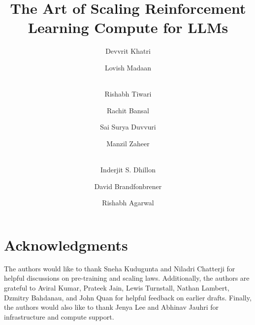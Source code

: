\documentclass[]{fairmeta} %
\title{The Art of Scaling Reinforcement Learning Compute for LLMs}
\author[2,*,\dagger]{Devvrit Khatri}
\author[1,3,*]{Lovish Madaan}
\author[4 \dagger]{\\Rishabh Tiwari}
\author[5 \dagger]{Rachit Bansal}
\author[2 \dagger]{Sai Surya Duvvuri}
\author[1 \dagger]{Manzil Zaheer}
\author[2]{\\Inderjit S. Dhillon}
\author[1]{David Brandfonbrener}
\author[6, \dagger]{Rishabh Agarwal}
\affiliation[1]{Meta}
\affiliation[2]{UT Austin}
\affiliation[3]{UCL}
\affiliation[4]{UC Berkeley}
\affiliation[5]{Harvard University}
\affiliation[6]{Periodic Labs}
\begin{document}
\maketitle









\section{Acknowledgments}
The authors would like to thank Sneha Kudugunta and Niladri Chatterji for helpful discussions on pre-training and scaling laws. Additionally, the authors are grateful to Aviral Kumar, Prateek Jain, Lewis Turnstall, Nathan Lambert, Dzmitry Bahdanau, and John Quan for helpful feedback on earlier drafts. Finally, the authors would also like to thank Jenya Lee and Abhinav Jauhri for infrastructure and compute support.




\appendix

\end{document}
